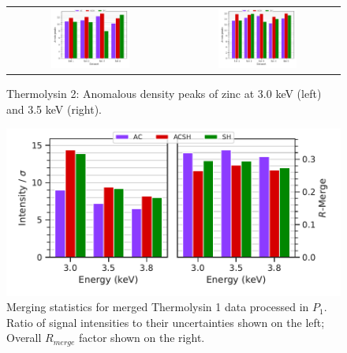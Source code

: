 \begin{figure}
    \centering
    \begin{tabular}{cc}
        \includegraphics[width = 0.5\textwidth]{plots/exp1/tlys_2_P6122/peaks/3p0_zinc.pdf} & \includegraphics[width = 0.5\textwidth]{plots/exp1/tlys_2_P6122/peaks/3p5_zinc.pdf}
    \end{tabular}
    \caption{Thermolysin 2: Anomalous density peaks of zinc at 3.0 \unit{keV} (left) and 3.5 \unit{keV} (right).}
    \label{fig:tlys2_zn_peaks}
\end{figure}



\begin{figure}[]
    \centering
    \includegraphics{plots/exp1/tlys_9_P1/merged_stats.pdf}
    \caption{Merging statistics for merged Thermolysin 1 data processed in $P_1$. Ratio of signal intensities to their uncertainties shown on the left; Overall $R_{merge}$ factor shown on the right.}
    \label{fig:tlys_9_p1}
\end{figure}

